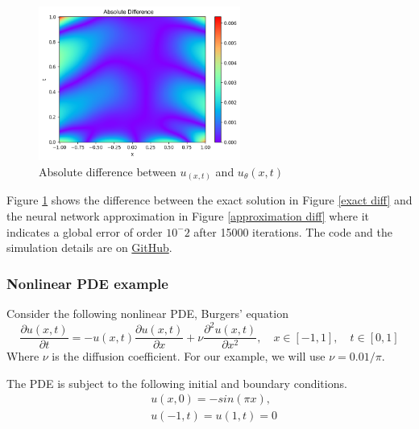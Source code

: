 \documentclass[a4paper,12pt]{article}
\theoremstyle{definition}
\begin{document}
\begin{figure}[H]
    \centering
    \includegraphics[width=250px]{images/difference_diff.png}
    \vspace{-1em}
    \caption{Absolute difference between $u_(x,t)$ and $u_\theta(x,t)$}
    \label{absolute diff}
\end{figure}

Figure \ref{absolute diff} shows the difference between the exact solution 
in Figure \ref{exact diff} and the neural network approximation in Figure \ref{approximation diff}
where it indicates a global error of order $10^-2$ after 15000 iterations. The code and the simulation
details are on \href{https://github.com/HashimAlSadah/MX-Project/blob/main/PINN/continuous_time_model/PDE_diffusion_PINN.ipynb}
{GitHub}.

\subsubsection{Nonlinear PDE example}
Consider the following nonlinear PDE, Burgers' equation
\begin{equation}
\frac{\partial u(x,t)}{\partial t} 
= -u(x,t)\frac{\partial u(x,t)}{\partial x} 
+ \nu \frac{\partial^2 u(x,t)}{\partial x^2}, \quad x \in [-1, 1], \quad t \in [0, 1]
\end{equation}
Where $\nu$ is the diffusion coefficient. For our example, we will use $\nu = 0.01 / \pi$.

The PDE is subject to the following initial and boundary conditions.
\begin{equation}
\begin{aligned}
&u(x, 0) = -sin(\pi x), \\
&u(-1, t) = u(1, t) = 0
\end{aligned}
\end{equation}
\end{document}
